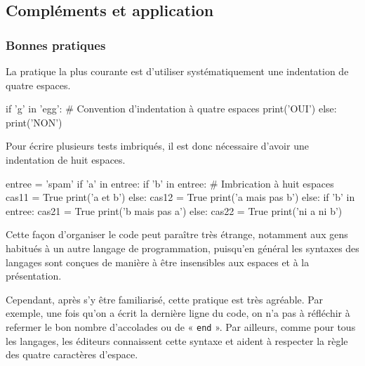 \subsection[Compléments et application]{Compléments et application}
\label{sub:XI.3.3}


\subsubsection[Bonnes pratiques]{Bonnes pratiques}
\label{subsub:XI.3.3.1}


La pratique la plus courante est d'utiliser systématiquement une indentation de quatre espaces.

\begin{idleconsole}
\begin{pyconsole}
if 'g' in 'egg': # Convention d'indentation à quatre espaces
    print('OUI')
else:
    print('NON')

\end{pyconsole}
\end{idleconsole}

Pour écrire plusieurs tests imbriqués, il est donc nécessaire d'avoir une indentation de huit espaces.

\begin{idleconsole}
\begin{pyconsole}
entree = 'spam'
if 'a' in entree:
    if 'b' in entree: # Imbrication à huit espaces
        cas11 = True
        print('a et b')
    else:
        cas12 = True
        print('a mais pas b')
else:
    if 'b' in entree:
        cas21 = True
        print('b mais pas a')
    else:
        cas22 = True
        print('ni a ni b')

\end{pyconsole}
\end{idleconsole}

Cette façon d'organiser le code peut paraître très étrange, notamment aux gens habitués à un autre langage de programmation, puisqu'en général les syntaxes des langages sont conçues de manière à être insensibles aux espaces et à la présentation.

Cependant, après s'y être familiarisé, cette pratique est très agréable. Par exemple, une fois qu'on a écrit la dernière ligne du code, on n'a pas à réfléchir à refermer le bon nombre d'accolades ou de « \texttt{end} ».
Par ailleurs, comme pour tous les langages, les éditeurs connaissent cette syntaxe et aident à respecter la règle des quatre caractères d'espace.

